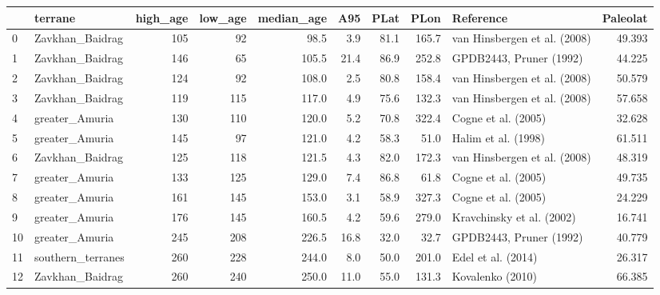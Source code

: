 \documentclass[11pt]{article}
\begin{document}
    {\tiny\begin{tabular}{llrrrrrrlr}
\toprule
{} &            terrane &  high\_age &  low\_age &  median\_age &   A95 &  PLat &   PLon &                               Reference &  Paleolat \\
\midrule
0  &    Zavkhan\_Baidrag &       105 &       92 &        98.5 &   3.9 &  81.1 &  165.7 &            van Hinsbergen et al. (2008) &    49.393 \\
1  &    Zavkhan\_Baidrag &       146 &       65 &       105.5 &  21.4 &  86.9 &  252.8 &                 GPDB2443, Pruner (1992) &    44.225 \\
2  &    Zavkhan\_Baidrag &       124 &       92 &       108.0 &   2.5 &  80.8 &  158.4 &            van Hinsbergen et al. (2008) &    50.579 \\
3  &    Zavkhan\_Baidrag &       119 &      115 &       117.0 &   4.9 &  75.6 &  132.3 &            van Hinsbergen et al. (2008) &    57.658 \\
4  &     greater\_Amuria &       130 &      110 &       120.0 &   5.2 &  70.8 &  322.4 &                     Cogne et al. (2005) &    32.628 \\
5  &     greater\_Amuria &       145 &       97 &       121.0 &   4.2 &  58.3 &   51.0 &                     Halim et al. (1998) &    61.511 \\
6  &    Zavkhan\_Baidrag &       125 &      118 &       121.5 &   4.3 &  82.0 &  172.3 &            van Hinsbergen et al. (2008) &    48.319 \\
7  &     greater\_Amuria &       133 &      125 &       129.0 &   7.4 &  86.8 &   61.8 &                     Cogne et al. (2005) &    49.735 \\
8  &     greater\_Amuria &       161 &      145 &       153.0 &   3.1 &  58.9 &  327.3 &                     Cogne et al. (2005) &    24.229 \\
9  &     greater\_Amuria &       176 &      145 &       160.5 &   4.2 &  59.6 &  279.0 &               Kravchinsky et al. (2002) &    16.741 \\
10 &     greater\_Amuria &       245 &      208 &       226.5 &  16.8 &  32.0 &   32.7 &                 GPDB2443, Pruner (1992) &    40.779 \\
11 &  southern\_terranes &       260 &      228 &       244.0 &   8.0 &  50.0 &  201.0 &                      Edel et al. (2014) &    26.317 \\
12 &    Zavkhan\_Baidrag &       260 &      240 &       250.0 &  11.0 &  55.0 &  131.3 &                        Kovalenko (2010) &    66.385 \\

\end{tabular}}
\end{document}
